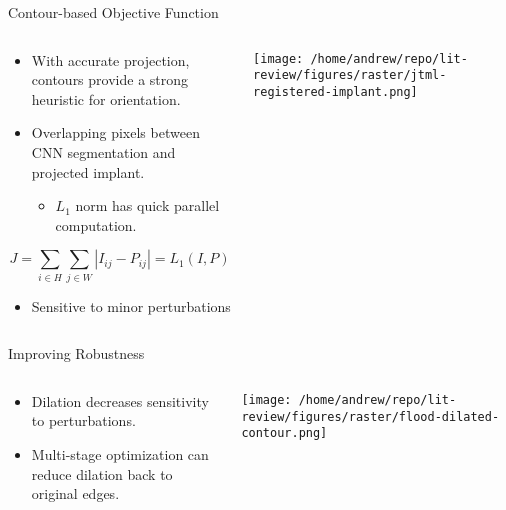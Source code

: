 \documentclass[presentation, aspectratio=1610]{beamer}
\begin{document}
\begin{frame}[label={sec:org067fba0}]{Contour-based Objective Function}
\begin{columns}
\begin{column}{0.5\columnwidth}
\begin{itemize}
\item With accurate projection, contours provide a strong heuristic for orientation.
\item Overlapping pixels between CNN segmentation and projected implant.
\begin{itemize}
\item \(L_1\) norm has quick parallel computation.
\end{itemize}
\end{itemize}

\begin{equation*}
  J = \sum_{i \in H}\sum_{j \in W}|I_{ij} - P_{ij}| = L_{1}(I,P)
\end{equation*}

\begin{itemize}
\item Sensitive to minor perturbations
\end{itemize}
\end{column}
\begin{column}{0.6\columnwidth}
\begin{center}
\texttt{[image: /home/andrew/repo/lit-review/figures/raster/jtml-registered-implant.png]}
\end{center}
\end{column}
\end{columns}
\end{frame}
\begin{frame}[label={sec:org9bd96c1}]{Improving Robustness}
\begin{columns}
\begin{column}{0.5\columnwidth}
\begin{itemize}
\item Dilation decreases sensitivity to perturbations.
\item Multi-stage optimization can reduce dilation back to original edges.
\end{itemize}
\end{column}
\begin{column}{0.6\columnwidth}
\begin{center}
\texttt{[image: /home/andrew/repo/lit-review/figures/raster/flood-dilated-contour.png]}
\end{center}
\end{column}
\end{columns}
\end{frame}
\end{document}
